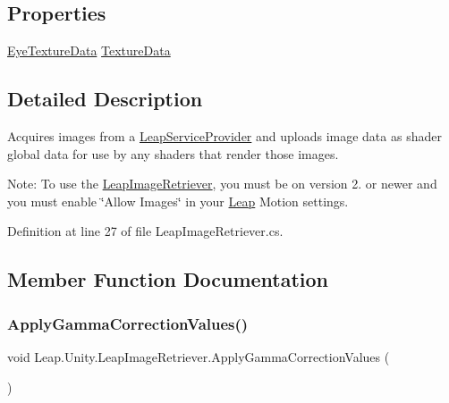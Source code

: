 \subsection*{Properties}
\begin{DoxyCompactItemize}
\item 
\mbox{\hyperlink{class_leap_1_1_unity_1_1_leap_image_retriever_1_1_eye_texture_data}{Eye\+Texture\+Data}} \mbox{\hyperlink{class_leap_1_1_unity_1_1_leap_image_retriever_af6a89e17fa19a47fe009bf2b008e111a}{Texture\+Data}}
\end{DoxyCompactItemize}


\subsection{Detailed Description}
Acquires images from a \mbox{\hyperlink{class_leap_1_1_unity_1_1_leap_service_provider}{Leap\+Service\+Provider}} and uploads image data as shader global data for use by any shaders that render those images. 

Note\+: To use the \mbox{\hyperlink{class_leap_1_1_unity_1_1_leap_image_retriever}{Leap\+Image\+Retriever}}, you must be on version 2. or newer and you must enable \char`\"{}\+Allow Images\char`\"{} in your \mbox{\hyperlink{namespace_leap_1_1_unity_1_1_leap}{Leap}} Motion settings. 

Definition at line 27 of file Leap\+Image\+Retriever.\+cs.



\subsection{Member Function Documentation}
\mbox{\label{class_leap_1_1_unity_1_1_leap_image_retriever_a51a8db3bc82cbcb3f7b38831fa01763f}} 
\subsubsection{\texorpdfstring{ApplyGammaCorrectionValues()}{ApplyGammaCorrectionValues()}}
{\footnotesize\ttfamily void Leap.\+Unity.\+Leap\+Image\+Retriever.\+Apply\+Gamma\+Correction\+Values (\begin{DoxyParamCaption}{ }\end{DoxyParamCaption})}



